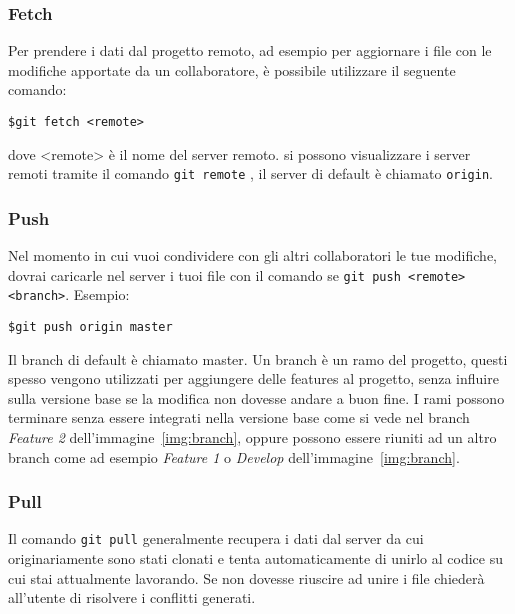 			\subsubsection*{Fetch}
				Per prendere i dati dal progetto remoto, ad esempio per aggiornare i file con le modifiche apportate da un collaboratore, è possibile utilizzare il seguente comando:
				\begin{tcolorbox}
					\texttt{\$\qquad git fetch <remote>}
				\end{tcolorbox}
				dove <remote> è il nome del server remoto. si possono visualizzare i server remoti tramite il comando \verb|git remote| , il server di default è chiamato \verb|origin|.
			
			
			\subsubsection*{Push}
				Nel momento in cui vuoi condividere con gli altri collaboratori le tue modifiche, dovrai caricarle nel server i tuoi file con il comando se \verb|git push <remote> <branch>|. Esempio:
				\begin{tcolorbox}
					\texttt{\$\qquad git push origin master}
				\end{tcolorbox}
				Il branch di default è chiamato master. Un branch è un ramo del progetto, questi spesso vengono utilizzati per aggiungere delle features al progetto, senza influire sulla versione base se la modifica non dovesse andare a buon fine. I rami possono terminare senza essere integrati nella versione base come si vede nel branch \textit{Feature 2} dell'immagine~\ref{img:branch}, oppure possono essere riuniti ad un altro branch come ad esempio \textit{Feature 1} o \textit{Develop} dell'immagine~\ref{img:branch}.
				
				\begin{center}
					\label{img:branch}
				\end{center}
			
			\subsubsection*{Pull}
				Il comando \verb|git pull| generalmente recupera i dati dal server da cui originariamente sono stati clonati e tenta automaticamente di unirlo al codice su cui stai attualmente lavorando. Se non dovesse riuscire ad unire i file chiederà all'utente di risolvere i conflitti generati.

